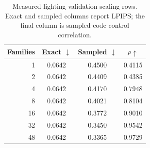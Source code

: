 \begin{table}[t]
\centering
\caption{Measured lighting validation scaling rows. Exact and sampled
columns report LPIPS; the final column is sampled-code control correlation.}
\label{tab:family_scaling}
\small\setlength{\tabcolsep}{4pt}
\begin{tabular*}{\linewidth}{@{\extracolsep{\fill}}rccc@{}}
\toprule
Families & Exact $\downarrow$ & Sampled $\downarrow$ & $\rho\uparrow$\\
\midrule
1 & 0.0642 & 0.4500 & 0.4115 \\
2 & 0.0642 & 0.4409 & 0.4385 \\
4 & 0.0642 & 0.4170 & 0.7948 \\
8 & 0.0642 & 0.4021 & 0.8104 \\
16 & 0.0642 & 0.3772 & 0.9010 \\
32 & 0.0642 & 0.3450 & 0.9542 \\
48 & 0.0642 & 0.3365 & 0.9729 \\
\bottomrule
\end{tabular*}
\end{table}
